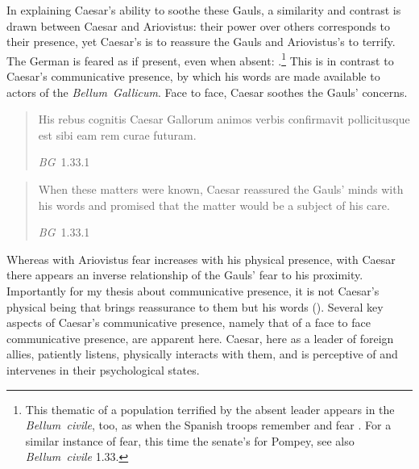 \documentclass[12pt,letterpaper,oneside,final]{memoir}
\begin{document}
In explaining Caesar's ability to soothe these Gauls, a similarity and contrast is drawn between Caesar and Ariovistus: their power over others corresponds to their presence, yet Caesar's is to reassure the Gauls and Ariovistus's to terrify. The German is feared as if present, even when absent: .\footnote{This thematic of a population terrified by the absent leader appears in the \emph{Bellum~civile}, too, as when the Spanish troops remember and fear . For a similar instance of fear, this time the senate's for Pompey, see also \emph{Bellum~civile} 1.33.} This is in contrast to Caesar's communicative presence, by which his words are made available to actors of the \emph{Bellum~Gallicum}. Face to face, Caesar soothes the Gauls' concerns. \blockquote[\emph{BG}~1.33.1]{\textlatin{His rebus cognitis Caesar Gallorum animos verbis confirmavit pollicitusque est sibi eam rem curae futuram.}} \blockquote[\emph{BG}~1.33.1]{When these matters were known, Caesar reassured the Gauls' minds with his words and promised that the matter would be a subject of his care.} Whereas with Ariovistus fear increases with his physical presence, with Caesar there appears an inverse relationship of the Gauls' fear to his proximity. Importantly for my thesis about communicative presence, it is not Caesar's physical being that brings reassurance to them but his words (). Several key aspects of Caesar's communicative presence, namely that of a face to face communicative presence, are apparent here. Caesar, here as a leader of foreign allies, patiently listens, physically interacts with them, and is perceptive of and intervenes in their psychological states.
\end{document}
